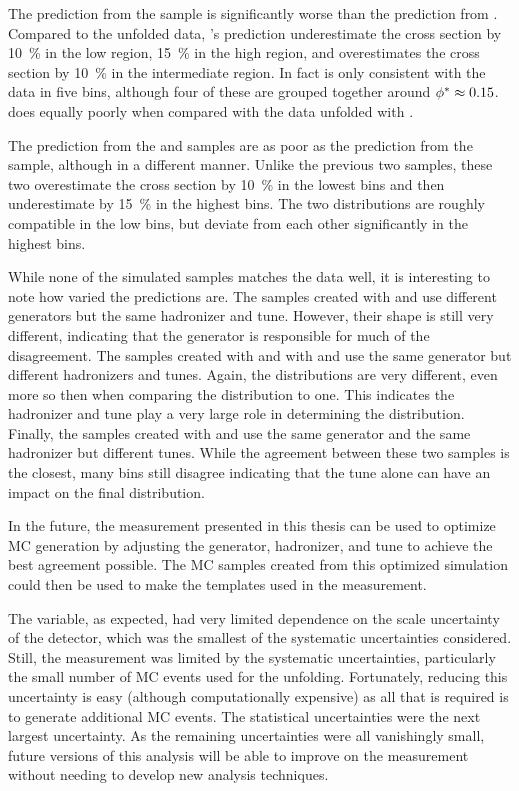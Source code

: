The prediction from the \PPsixZtwo sample is significantly worse than the
prediction from \MADGRAPH. Compared to the \MADGRAPH unfolded data, \POWHEG's
prediction underestimate the cross section by \SI{10}{\percent} in the low
\phistar region, \SI{15}{\percent} in the high \phistar region, and
overestimates the cross section by \SI{10}{\percent} in the intermediate
region. In fact \POWHEG is only consistent with the data in five bins, although
four of these are grouped together around $\phi^{*} \approx 0.15$. \PPsixZtwo
does equally poorly when compared with the data unfolded with \PPsixZtwo.

The prediction from the \PPeightTTfive and \PPeightTTfourteen samples are as
poor as the prediction from the \PPsixZtwo sample, although in a different
manner. Unlike the previous two samples, these two overestimate the cross
section by \SI{10}{\percent} in the lowest \phistar bins and then underestimate
by \SI{15}{\percent} in the highest \phistar bins. The two distributions are
roughly compatible in the low \phistar bins, but deviate from each other
significantly in the highest bins.

While none of the simulated samples matches the data well, it is interesting to
note how varied the predictions are. The samples created with \MGsixZtwo and
\PPsixZtwo use different generators but the same hadronizer and tune. However,
their shape is still very different, indicating that the generator is
responsible for much of the disagreement. The samples created with \PPsixZtwo
and with \PPeightTTfive and \PPeightTTfourteen use the same generator but
different hadronizers and tunes. Again, the distributions are very different,
even more so then when comparing the \MADGRAPH distribution to \POWHEG one.
This indicates the hadronizer and tune play a very large role in determining
the \phistar distribution. Finally, the samples created with \PPeightTTfive and
\PPeightTTfourteen use the same generator and the same hadronizer but different
tunes. While the agreement between these two samples is the closest, many bins
still disagree indicating that the tune alone can have an impact on the final
distribution.

In the future, the measurement presented in this thesis can be used to optimize
MC generation by adjusting the generator, hadronizer, and tune to achieve the
best agreement possible. The MC samples created from this optimized simulation
could then be used to make the templates used in the \MassW measurement.

The \phistar variable, as expected, had very limited dependence on the \pt
scale uncertainty of the detector, which was the smallest of the systematic
uncertainties considered. Still, the measurement was limited by the systematic
uncertainties, particularly the small number of MC events used for the
unfolding. Fortunately, reducing this uncertainty is easy (although
computationally expensive) as all that is required is to generate additional MC
events. The statistical uncertainties were the next largest uncertainty. As the
remaining uncertainties were all vanishingly small, future versions of this
analysis will be able to improve on the measurement without needing to develop
new analysis techniques.
